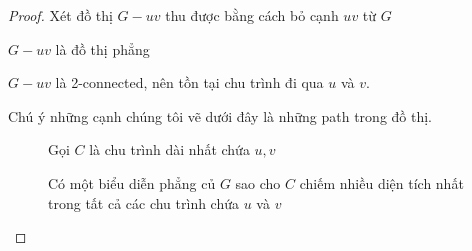 \begin{proof}
    Xét đồ thị $G-uv$ thu được bằng cách bỏ cạnh $uv$ từ $G$

    $G-uv$ là đồ thị phẳng

    $G-uv$ là 2-connected, nên tồn tại chu trình đi qua $u$ và $v$.

    \begin{remark}
        Chú ý những cạnh chúng tôi vẽ dưới đây là những path trong đồ thị.
    \end{remark}

    \begin{figure}[H]
        \begin{minipage}{0.4\textwidth}
        \end{minipage}
        \hfill
        \begin{minipage}{0.5\textwidth}
            Gọi $C$ là chu trình dài nhất chứa $u,v$
        \end{minipage}

    \end{figure}

    \begin{figure}[H]
        \begin{minipage}{0.4\textwidth}
        \end{minipage}
        \hfill
        \begin{minipage}{0.5\textwidth}
            Có một biểu diễn phẳng củ $G$ sao cho $C$ chiếm nhiều diện tích nhất trong tất cả các chu trình chứa $u$ và $v$
        \end{minipage}

    \end{figure}


\end{proof}
